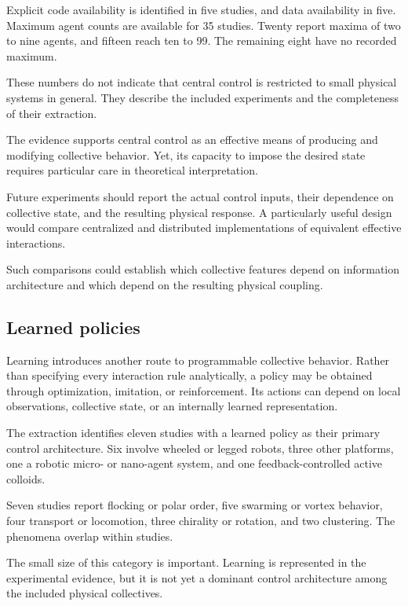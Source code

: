 Explicit code availability
is identified in five studies,
and data availability in five.
Maximum agent counts
are available for 35 studies.
Twenty report maxima
of two to nine agents,
and fifteen reach
ten to 99.
The remaining eight
have no recorded maximum.

These numbers do not
indicate that central
control is restricted
to small physical
systems in general.
They describe the
included experiments
and the completeness
of their extraction.

The evidence supports
central control as
an effective means
of producing and
modifying collective
behavior. Yet, its
capacity to impose
the desired state
requires particular
care in theoretical
interpretation.

Future experiments
should report the
actual control inputs,
their dependence on
collective state,
and the resulting
physical response.
A particularly useful
design would compare
centralized and
distributed implementations
of equivalent
effective interactions.

Such comparisons
could establish
which collective
features depend
on information
architecture and
which depend on
the resulting
physical coupling.

\subsection{Learned policies}
\label{sec:control-learning}

Learning introduces another route to programmable
collective behavior. Rather than specifying every
interaction rule analytically, a policy may be
obtained through optimization, imitation, or
reinforcement. Its actions can depend on local
observations, collective state, or an internally
learned representation.

The extraction identifies eleven studies with
a learned policy as their primary control
architecture. Six involve wheeled or legged
robots, three other platforms, one a robotic
micro- or nano-agent system, and one
feedback-controlled active colloids.

Seven studies report flocking or polar order,
five swarming or vortex behavior,
four transport or locomotion,
three chirality or rotation,
and two clustering.
The phenomena overlap within studies.

The small size of this category is important.
Learning is represented in the experimental
evidence, but it is not yet a dominant
control architecture among the included
physical collectives.

